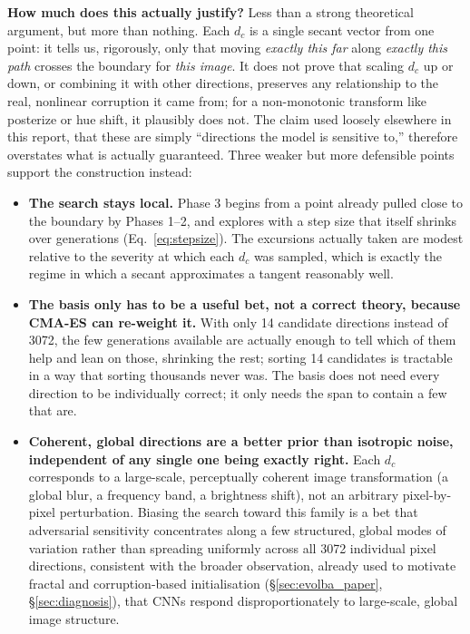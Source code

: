 \documentclass[11pt, a4paper]{article}
\begin{document}
\textbf{How much does this actually justify?} Less than a strong theoretical argument, but more than nothing. Each $d_c$ is a single secant vector from one point: it tells us, rigorously, only that moving \emph{exactly this far} along \emph{exactly this path} crosses the boundary for \emph{this image}. It does not prove that scaling $d_c$ up or down, or combining it with other directions, preserves any relationship to the real, nonlinear corruption it came from; for a non-monotonic transform like posterize or hue shift, it plausibly does not. The claim used loosely elsewhere in this report, that these are simply ``directions the model is sensitive to,'' therefore overstates what is actually guaranteed. Three weaker but more defensible points support the construction instead:

\begin{itemize}[noitemsep]
  \item \textbf{The search stays local.} Phase 3 begins from a point already pulled close to the boundary by Phases 1--2, and explores with a step size that itself shrinks over generations (Eq.~\ref{eq:stepsize}). The excursions actually taken are modest relative to the severity at which each $d_c$ was sampled, which is exactly the regime in which a secant approximates a tangent reasonably well.
  \item \textbf{The basis only has to be a useful bet, not a correct theory, because CMA-ES can re-weight it.} With only 14 candidate directions instead of 3072, the few generations available are actually enough to tell which of them help and lean on those, shrinking the rest; sorting 14 candidates is tractable in a way that sorting thousands never was. The basis does not need every direction to be individually correct; it only needs the span to contain a few that are.
  \item \textbf{Coherent, global directions are a better prior than isotropic noise, independent of any single one being exactly right.} Each $d_c$ corresponds to a large-scale, perceptually coherent image transformation (a global blur, a frequency band, a brightness shift), not an arbitrary pixel-by-pixel perturbation. Biasing the search toward this family is a bet that adversarial sensitivity concentrates along a few structured, global modes of variation rather than spreading uniformly across all 3072 individual pixel directions, consistent with the broader observation, already used to motivate fractal and corruption-based initialisation (\S\ref{sec:evolba_paper}, \S\ref{sec:diagnosis}), that CNNs respond disproportionately to large-scale, global image structure.
\end{itemize}
\end{document}
